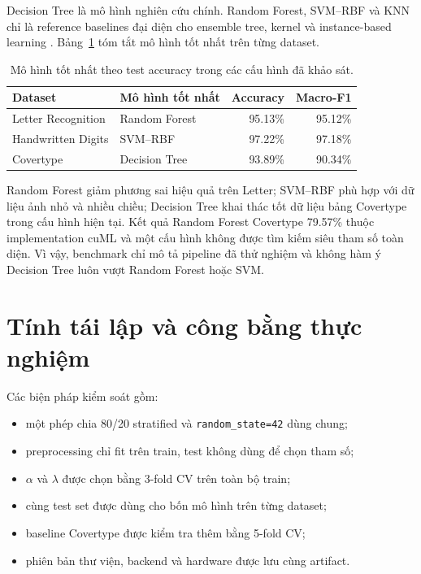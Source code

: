 Decision Tree là mô hình nghiên cứu chính. Random Forest, SVM--RBF và KNN chỉ là reference baselines đại diện cho ensemble tree, kernel và instance-based learning \cite{breiman2001rf,cortes1995svm,cover1967knn}. Bảng~\ref{tab:best-models} tóm tắt mô hình tốt nhất trên từng dataset.

\begin{table}[H]
    \centering
    \small
    \caption[Mô hình tốt nhất trên từng bộ dữ liệu]{Mô hình tốt nhất theo test accuracy trong các cấu hình đã khảo sát.}
    \label{tab:best-models}
    \begin{tabular}{@{}llrr@{}}
        \toprule
        \textbf{Dataset} & \textbf{Mô hình tốt nhất} & \textbf{Accuracy} & \textbf{Macro-F1} \\
        \midrule
        Letter Recognition & Random Forest & 95.13\% & 95.12\% \\
        Handwritten Digits & SVM--RBF & 97.22\% & 97.18\% \\
        Covertype & Decision Tree & 93.89\% & 90.34\% \\
        \bottomrule
    \end{tabular}
\end{table}

Random Forest giảm phương sai hiệu quả trên Letter; SVM--RBF phù hợp với dữ liệu ảnh nhỏ và nhiều chiều; Decision Tree khai thác tốt dữ liệu bảng Covertype trong cấu hình hiện tại. Kết quả Random Forest Covertype 79.57\% thuộc implementation cuML và một cấu hình không được tìm kiếm siêu tham số toàn diện. Vì vậy, benchmark chỉ mô tả pipeline đã thử nghiệm và không hàm ý Decision Tree luôn vượt Random Forest hoặc SVM.

\section{Tính tái lập và công bằng thực nghiệm}

Các biện pháp kiểm soát gồm:

\begin{itemize}
    \item một phép chia 80/20 stratified và \texttt{random\_state=42} dùng chung;
    \item preprocessing chỉ fit trên train, test không dùng để chọn tham số;
    \item $\alpha$ và $\lambda$ được chọn bằng 3-fold CV trên toàn bộ train;
    \item cùng test set được dùng cho bốn mô hình trên từng dataset;
    \item baseline Covertype được kiểm tra thêm bằng 5-fold CV;
    \item phiên bản thư viện, backend và hardware được lưu cùng artifact.
\end{itemize}

